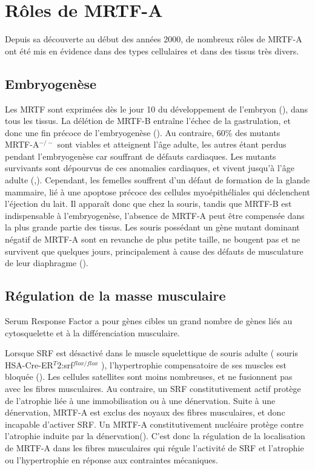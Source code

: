 \documentclass{report}
\begin{document}
\section{Rôles de MRTF-A}
Depuis sa découverte au début des années 2000, de nombreux rôles de MRTF-A ont été mis en évidence dans des types cellulaires et dans des tissus très divers. 
\subsection{Embryogenèse}

Les MRTF sont exprimées dès le jour 10 du développement de l'embryon (\cite{wang_potentiation_2002}), dans tous les tissus. La délétion de MRTF-B entraîne l'échec de la gastrulation, et donc une fin précoce de l'embryogenèse (\cite{kalita_mkls:_2012}). Au contraire, 60\% des mutants MRTF-A$^{-/-}$ sont viables et atteignent l'âge adulte, les autres étant perdus pendant l'embryogenèse car souffrant de défauts cardiaques. Les mutants survivants sont dépourvus de ces anomalies cardiaques, et vivent jusqu'à l'âge adulte (\cite{li_requirement_2006},\cite{sun_acute_2006}). Cependant, les femelles souffrent d'un défaut de formation de la glande mammaire,  lié à une apoptose précoce des cellules myoépithéliales qui déclenchent l'éjection du lait. Il apparaît donc que chez la souris, tandis que MRTF-B est indispensable à l'embryogenèse, l'absence de MRTF-A peut être compensée dans la plus grande partie des tissus. 
Les souris possédant un gène mutant dominant négatif de MRTF-A sont en revanche de plus petite taille, ne bougent pas et ne survivent que quelques jours, principalement à cause des défauts de musculature de leur diaphragme (\cite{li_requirement_2005}). 

\subsection{Régulation de la masse musculaire}

Serum Response Factor a pour gènes cibles un grand nombre de gènes liés au cytosquelette et à la différenciation musculaire. 

Lorsque SRF est désactivé dans le muscle squelettique de souris adulte ( souris HSA-Cre-ER$^T2$:srf$^{flox/flox}$ ), l'hypertrophie compensatoire de ses muscles est bloquée (\cite{guerci_srf-dependent_2012}). Les cellules satellites sont moins nombreuses, et ne fusionnent pas avec les fibres musculaires. Au contraire, un SRF constitutivement actif protège de l'atrophie liée à une immobilisation ou à une dénervation. 
Suite à une dénervation, MRTF-A est exclus des noyaux des fibres musculaires, et donc incapable d'activer SRF. Un MRTF-A constitutivement nucléaire protège contre l'atrophie induite par la dénervation(\cite{collard_nuclear_2014}). C'est donc la régulation de la localisation de MRTF-A dans les fibres musculaires qui régule l'activité de SRF et l'atrophie ou l'hypertrophie en réponse aux contraintes mécaniques.  
\end{document}
